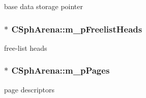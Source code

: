 base data storage pointer 

\hypertarget{classCSphArena_a2192a3b8b0822b1014198238077abf32}{
\subsubsection[{m\-\_\-p\-Freelist\-Heads}]{$\ast$ C\-Sph\-Arena\-::m\-\_\-p\-Freelist\-Heads\hspace{0.3cm}{\ttfamily [protected]}}}\label{classCSphArena_a2192a3b8b0822b1014198238077abf32}


free-\/list heads 

\hypertarget{classCSphArena_ae7fd6cb1413c5e9ad06bb97744116c81}{
\subsubsection[{m\-\_\-p\-Pages}]{$\ast$ C\-Sph\-Arena\-::m\-\_\-p\-Pages\hspace{0.3cm}{\ttfamily [protected]}}}\label{classCSphArena_ae7fd6cb1413c5e9ad06bb97744116c81}


page descriptors 

